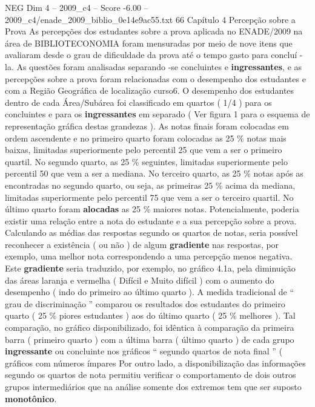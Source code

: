 \begin{textsample}{NEG Dim 4 – 2009\_c4 – Score -6.00 – 2009\_c4/enade\_2009\_biblio\_0e14e9ac55.txt}  \label{ex:f4_neg_022}
66 Capítulo 4 Percepção sobre a Prova As percepções dos estudantes sobre a prova aplicada no ENADE/2009 na área de BIBLIOTECONOMIA foram mensuradas por meio de nove itens que avaliaram desde o grau de dificuldade da prova até o tempo gasto para concluí -la.
As questões foram analisadas separando -se concluintes e \textbf{ingressantes}, e as percepções sobre a prova foram relacionadas com o desempenho dos estudantes e com a Região Geográfica de localização curso6.
O desempenho dos estudantes dentro de cada Área/Subárea foi classificado em quartos ( 1/4 ) para os concluintes e para os \textbf{ingressantes} em separado ( Ver figura 1 para o esquema de representação gráfica destas grandezas ).
As notas finais foram colocadas em ordem ascendente e no primeiro quarto foram colocadas as 25 \% notas mais baixas, limitadas superiormente pelo percentil 25 que vem a ser o primeiro quartil.
No segundo quarto, as 25 \% seguintes, limitadas superiormente pelo percentil 50 que vem a ser a mediana.
No terceiro quarto, as 25 \% notas após as encontradas no segundo quarto, ou seja, as primeiras 25 \% acima da mediana, limitadas superiormente pelo percentil 75 que vem a ser o terceiro quartil.
No último quarto foram \textbf{alocadas} as 25 \% maiores notas.
Potencialmente, poderia existir uma relação entre a nota do estudante e a sua percepção sobre a prova.
Calculando as médias das respostas segundo os quartos de notas, seria possível reconhecer a existência ( ou não ) de algum \textbf{gradiente} nas respostas, por exemplo, uma melhor nota correspondendo a uma percepção menos negativa.
Este \textbf{gradiente} seria traduzido, por exemplo, no gráfico 4.1a, pela diminuição das áreas laranja e vermelha ( Difícil e Muito difícil ) com o aumento do desempenho ( indo do primeiro ao último quarto ).
A medida tradicional de “ grau de discriminação ” comparou os resultados dos estudantes do primeiro quarto ( 25 \% piores estudantes ) aos do último quarto ( 25 \% melhores ).
Tal comparação, no gráfico disponibilizado, foi idêntica à comparação da primeira barra ( primeiro quarto ) com a última barra ( último quarto ) de cada grupo \textbf{ingressante} ou concluinte nos gráficos “ segundo quartos de nota final ” ( gráficos com números ímpares Por outro lado, a disponibilização das informações segundo os quartos de nota permitiu verificar o comportamento de dois outros grupos intermediários que na análise somente dos extremos tem que ser suposto \textbf{monotônico}.

\end{textsample}
